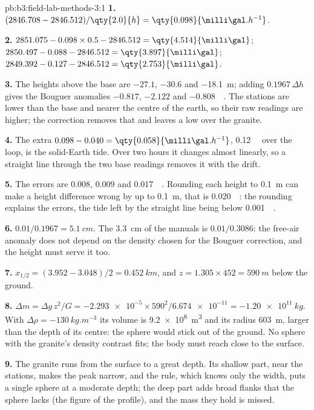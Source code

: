 \begin{solution}{pb:b3:field-lab-methods-3:1}
\textbf{1.} $(2846.708 - 2846.512)/\qty{2.0}{h} = \qty{0.098}{\milli\gal.h^{-1}}$.

\textbf{2.} $2851.075 - 0.098\times0.5 - 2846.512 = \qty{4.514}{\milli\gal}$;
$2850.497 - 0.088 - 2846.512 = \qty{3.897}{\milli\gal}$;
$2849.392 - 0.127 - 2846.512 = \qty{2.753}{\milli\gal}$.

\textbf{3.} The heights above the base are $-27.1$, $-30.6$ and
\qty{-18.1}{m}; adding $0.1967\,\Delta h$ gives the Bouguer anomalies
$\num{-0.817}$, $\num{-2.122}$ and \qty{-0.808}{\milli\gal}. The
stations are lower than the base and nearer the centre of the earth,
so their raw readings are higher; the correction removes that and
leaves a low over the granite.

\textbf{4.} The extra $0.098 - 0.040 = \qty{0.058}{\milli\gal.h^{-1}}$,
\qty{0.12}{\milli\gal} over the loop, is the solid-Earth tide. Over two
hours it changes almost linearly, so a straight line through the two
base readings removes it with the drift.

\textbf{5.} The errors are $\num{0.008}$, $\num{0.009}$ and
\qty{0.017}{\milli\gal}. Rounding each height to \qty{0.1}{m} can make
a height difference wrong by up to \qty{0.1}{m}, that is
\qty{0.020}{\milli\gal}: the rounding explains the errors, the tide
left by the straight line being below \qty{0.001}{\milli\gal}.

\textbf{6.} $0.01/0.1967 = \qty{5.1}{cm}$. The \qty{3.3}{cm} of the manuals is
$0.01/0.3086$: the free-air anomaly does not depend on the density
chosen for the Bouguer correction, and the height must serve it too.

\textbf{7.} $x_{1/2} = (3.952 - 3.048)/2 = \qty{0.452}{km}$, and $z = 1.305
\times452 = \qty{590}{m}$ below the ground.

\textbf{8.} $\Delta m = \Delta g\,z^2/G = \num{-2.293e-5}\times590^2/
\num{6.674e-11} = \qty{-1.20e11}{kg}$. With $\Delta\rho =
\qty{-130}{kg.m^{-3}}$ its volume is \qty{9.2e8}{m^3} and its radius
\qty{603}{m}, larger than the depth of its centre: the sphere would
stick out of the ground. No sphere with the granite's density contrast
fits; the body must reach close to the surface.

\textbf{9.} The granite runs from the surface to a great depth. Its shallow
part, near the stations, makes the peak narrow, and the rule, which
knows only the width, puts a single sphere at a moderate depth; the
deep part adds broad flanks that the sphere lacks (the figure of the
profile), and the mass they hold is missed.


\end{solution}
